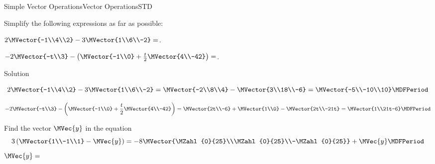 \begin{MXContent}{Simple Vector Operations}{Vector Operations}{STD}
\begin{MExercise}
\end{MExercise}

\begin{MExercise}
Simplify the following expressions as far as possible:
\begin{MExerciseItems}
\item{$2\MVector{-1\\4\\2}-3\MVector{1\\6\\-2}=$.} 
\item{$-2\MVector{-t\\3}-\left(\MVector{-1\\0}+\frac{t}{2}\MVector{4\\-42}\right)=$.}
\end{MExerciseItems}
\end{MExercise}

\begin{MHint}{Solution}
\begin{MExerciseItems}
\item{
\[
 2\MVector{-1\\4\\2}-3\MVector{1\\6\\-2}=\MVector{-2\\8\\4}-\MVector{3\\18\\-6}=\MVector{-5\\-10\\10} \MDFPeriod
\]
} 
\item{
\[
 -2\MVector{-t\\3}-\left(\MVector{-1\\0}+\frac{t}{2}\MVector{4\\-42}\right)=\MVector{2t\\-6}+\MVector{1\\0}-\MVector{2t\\-21t}=\MVector{1\\21t-6} \MDFPeriod
\]

}
\end{MExerciseItems}
 
\end{MHint}

\begin{MExercise}
Find the vector $\MVec{y}$ in the equation
\[
 3\left(\MVector{1\\-1\\1}-\MVec{y}\right)=-8\MVector{\MZahl{0}{25}\\\MZahl{0}{25}\\-\MZahl{0}{25}}+\MVec{y} \MDFPeriod
\]
$\MVec{y}=$
\end{MExercise}


\end{MXContent}
